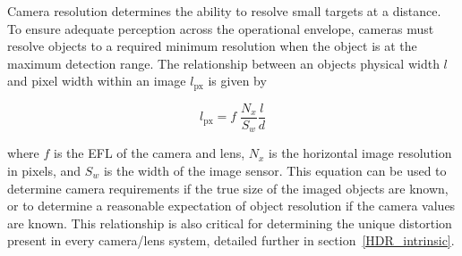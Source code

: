 \documentclass{erauthesis}
\begin{document}
Camera resolution determines the ability to resolve small targets at a distance.
To ensure adequate perception across the operational envelope, cameras must resolve objects to a required minimum resolution when the object is at the maximum detection range.  
The relationship between an objects physical width $\mathit{l}$ and pixel width within an image $\mathit{l}_{\text{px}}$ is given by

\begin{equation}
\mathit{l}_{\text{px}} = f \; \frac{N_x}{S_w}\frac{\mathit{l}}{d}
\end{equation}

where $f$ is the \ac{EFL} of the camera and lens, $N_x$ is the horizontal image resolution in pixels, and $S_w$ is the width of the image sensor.
This equation can be used to determine camera requirements if the true size of the imaged objects are known, or to determine a reasonable expectation of object resolution if the camera values are known.
This relationship is also critical for determining the unique distortion present in every camera/lens system, detailed further in section~\ref{HDR_intrinsic}.


\end{document}
